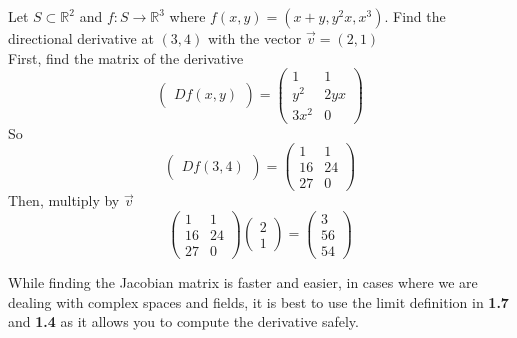 \begin{eg}
  Let $S \subset \mathbb{R}^2$ and $f: S \to \mathbb{R}^3$ where $f(x, y) = (x + y, y^2x, x^3)$.
  Find the directional derivative at $(3, 4)$ with the vector $\vec{v} = (2, 1)$\\
  First, find the matrix of the derivative
  \begin{displaymath}
    \begin{pmatrix}
      Df(x, y)
    \end{pmatrix} = 
    \begin{pmatrix}
      1 & 1\\
      y^2 & 2yx\\
      3x^2 & 0
    \end{pmatrix}
  \end{displaymath}
  So
  \begin{displaymath}
    \begin{pmatrix}
      Df(3, 4)
    \end{pmatrix} = 
    \begin{pmatrix}
      1 & 1\\
      16 & 24\\
      27 & 0
    \end{pmatrix}
  \end{displaymath}
  Then, multiply by $\vec{v}$
  \begin{displaymath}
    \begin{pmatrix}
      1 & 1\\
      16 & 24\\
      27 & 0
    \end{pmatrix}
    \begin{pmatrix}
      2\\
      1
    \end{pmatrix}
    = \begin{pmatrix}
      3\\
      56\\
      54
    \end{pmatrix}
  \end{displaymath}
\end{eg}
\begin{remark}
  While finding the Jacobian matrix is faster and easier, in cases where we are dealing
  with complex spaces and fields, it is best to use the limit definition in \textbf{1.7} and 
  \textbf{1.4} as it allows you to compute the derivative safely.
\end{remark}
